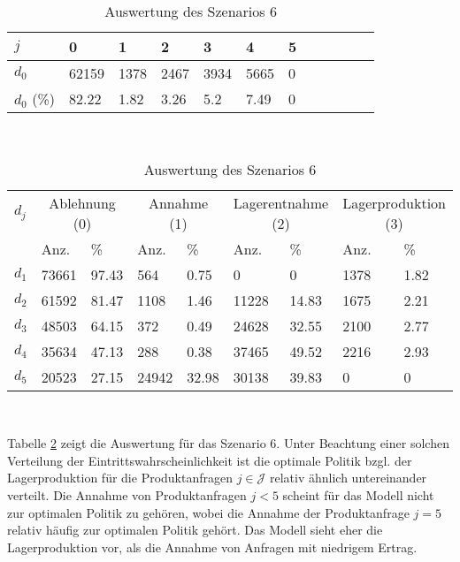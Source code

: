 \begin{table}[h!]
\renewcommand{\arraystretch}{1.5}
  \begin{center}
    \caption{Auswertung des Szenarios 6}  \label{AS6}
    \vspace*{3mm}
    \begin{tabular}{l l l l l l l l l l l l }  \hline 
         $j$ & 0 & 1  & 2 & 3 & 4  & 5   \\  \hline
$d_{0}$ &  62159 &  1378 &  2467 &  3934 &  5665 &  0 \\
$d_{0}$ (\%) &  82.22 &  1.82 &  3.26 &   5.2 &  7.49 &  0 \\
\hline
    \end{tabular} \\[3mm]
        \begin{tabular}{ l l l l l l l l l}   \hline    %
    $d_j$ & \multicolumn{2}{c}{Ablehnung (0)} & \multicolumn{2}{c}{Annahme (1)}  & \multicolumn{2}{c}{Lagerentnahme (2)} & \multicolumn{2}{c}{Lagerproduktion (3)}\\
    & Anz. & \% & Anz. & \% & Anz. & \% & Anz. & \% \\ \hline 
$d_{1}$ &  73661 &  97.43 &    564 &   0.75 &    0 &    0 &  1378 &  1.82 \\
$d_{2}$ &  61592 &  81.47 &   1108 &   1.46 &  11228 &  14.83 &  1675 &  2.21 \\
$d_{3}$ &  48503 &  64.15 &    372 &   0.49 &  24628 &  32.55 &  2100 &  2.77 \\
$d_{4}$ &  35634 &  47.13 &    288 &   0.38 &  37465 &  49.52 &  2216 &  2.93 \\
$d_{5}$ &  20523 &  27.15 &  24942 &  32.98 &  30138 &  39.83 &   0 &   0 \\
          \hline
   \end{tabular} \\[3mm]
     \end{center}
\end{table}

Tabelle \ref{AS6} zeigt die Auswertung für das Szenario 6. Unter Beachtung einer solchen Verteilung der Eintrittswahrscheinlichkeit ist die optimale Politik bzgl. der Lagerproduktion für die Produktanfragen $j\in\mathcal{J}$ relativ ähnlich untereinander verteilt. Die Annahme von Produktanfragen $j<5$ scheint für das Modell nicht zur optimalen Politik zu gehören, wobei die Annahme der Produktanfrage $j=5$ relativ häufig zur optimalen Politik gehört. Das Modell sieht eher die Lagerproduktion vor, als die Annahme von Anfragen mit niedrigem Ertrag. %


